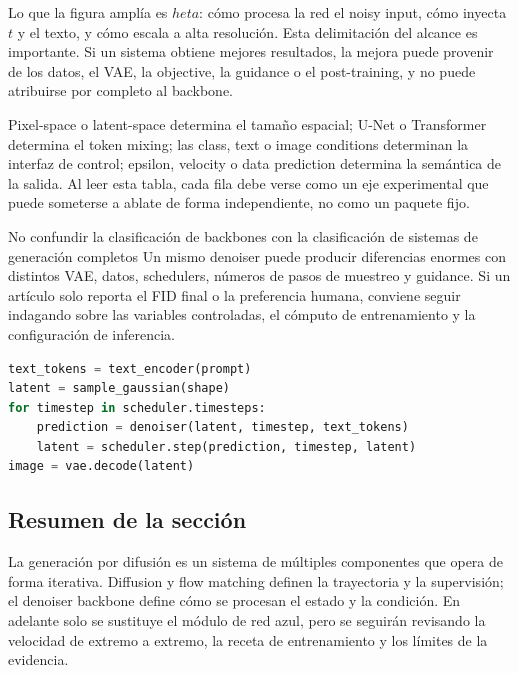 Lo que la figura amplía es $	heta$: cómo procesa la red el noisy input, cómo inyecta $t$ y el texto, y cómo escala a alta resolución. Esta delimitación del alcance es importante. Si un sistema obtiene mejores resultados, la mejora puede provenir de los datos, el VAE, la objective, la guidance o el post-training, y no puede atribuirse por completo al backbone.


Pixel-space o latent-space determina el tamaño espacial; U-Net o Transformer determina el token mixing; las class, text o image conditions determinan la interfaz de control; epsilon, velocity o data prediction determina la semántica de la salida. Al leer esta tabla, cada fila debe verse como un eje experimental que puede someterse a ablate de forma independiente, no como un paquete fijo.

\begin{warningbox}{No confundir la clasificación de backbones con la clasificación de sistemas de generación completos}
Un mismo denoiser puede producir diferencias enormes con distintos VAE, datos, schedulers, números de pasos de muestreo y guidance. Si un artículo solo reporta el FID final o la preferencia humana, conviene seguir indagando sobre las variables controladas, el cómputo de entrenamiento y la configuración de inferencia.
\end{warningbox}

\begin{lstlisting}[language=Python,caption={Flujo de muestreo simplificado de un sistema de difusión text-to-image}]
text_tokens = text_encoder(prompt)
latent = sample_gaussian(shape)
for timestep in scheduler.timesteps:
    prediction = denoiser(latent, timestep, text_tokens)
    latent = scheduler.step(prediction, timestep, latent)
image = vae.decode(latent)
\end{lstlisting}

\subsection{Resumen de la sección}

La generación por difusión es un sistema de múltiples componentes que opera de forma iterativa. Diffusion y flow matching definen la trayectoria y la supervisión; el denoiser backbone define cómo se procesan el estado y la condición. En adelante solo se sustituye el módulo de red azul, pero se seguirán revisando la velocidad de extremo a extremo, la receta de entrenamiento y los límites de la evidencia.
